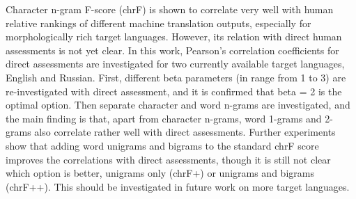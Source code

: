 Character n-gram F-score (chrF) is shown to correlate very well with human relative rankings of different machine translation outputs, especially for morphologically rich target languages. However, its relation with direct human assessments is not yet clear. In this work, Pearson's correlation coefficients for direct assessments are investigated for two currently available target languages, English and Russian. First, different beta parameters (in range from 1  to 3) are re-investigated with direct assessment,  and it is confirmed that beta = 2 is the optimal option. Then separate character and word n-grams are investigated, and the main finding is that, apart from character n-grams, word 1-grams and 2-grams also correlate rather well with direct assessments. Further experiments show that adding word unigrams and bigrams to the standard chrF score improves the correlations with direct assessments, though it is still not clear which option is better, unigrams only (chrF+) or unigrams and bigrams (chrF++). This should be investigated in future work on more target languages.
